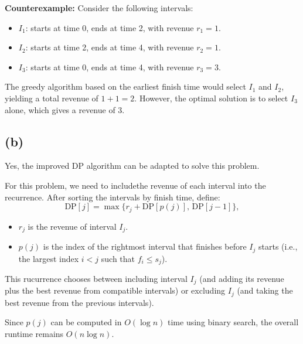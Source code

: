 \documentclass[11pt]{article}
\begin{document}
    \medskip
    \noindent\textbf{Counterexample:} Consider the following intervals:
    \begin{itemize}
        \item \( I_1 \): starts at time 0, ends at time 2, with revenue \( r_1 = 1 \).
        \item \( I_2 \): starts at time 2, ends at time 4, with revenue \( r_2 = 1 \).
        \item \( I_3 \): starts at time 0, ends at time 4, with revenue \( r_3 = 3 \).
    \end{itemize}
    The greedy algorithm based on the earliest finish time would select \( I_1 \) and \( I_2 \), yielding a total revenue of \( 1 + 1 = 2.\)
    However, the optimal solution is to select \( I_3 \) alone, which gives a revenue of 3.
    
    \subsection*{(b)}
    Yes, the improved DP algorithm can be adapted to solve this problem.
    
    \medskip
    \noindent For this problem, we need to includethe revenue of each interval into the recurrence. After sorting the intervals by finish time, define:
    \[
    \text{DP}[j] = \max\{r_j + \text{DP}[p(j)],\, \text{DP}[j-1]\},
    \]
    \begin{itemize}
        \item \( r_j \) is the revenue of interval \( I_j \).
        \item \( p(j) \) is the index of the rightmost interval that finishes before \( I_j \) starts (i.e., the largest index \( i < j \) such that \( f_i \le s_j \)).
    \end{itemize}
    
    \medskip
    \noindent This rucurrence chooses between including interval \( I_j \) (and adding its revenue plus the best revenue from compatible intervals) or excluding \( I_j \) (and taking the best revenue from the previous intervals). 

    \noindent Since \( p(j) \) can be computed in \( O(\log n) \) time using binary search, the overall runtime remains \( O(n \log n) \).
    


    \newpage
\end{document}
